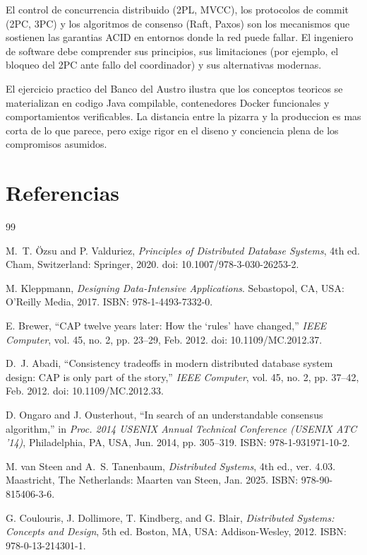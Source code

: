 \documentclass[11pt,a4paper]{article}
\begin{document}
El control de concurrencia distribuido (2PL, MVCC), los protocolos de commit (2PC, 3PC) y los algoritmos de consenso (Raft, Paxos) son los mecanismos que sostienen las garantias ACID en entornos donde la red puede fallar. El ingeniero de software debe comprender sus principios, sus limitaciones (por ejemplo, el bloqueo del 2PC ante fallo del coordinador) y sus alternativas modernas.

El ejercicio practico del Banco del Austro ilustra que los conceptos teoricos se materializan en codigo Java compilable, contenedores Docker funcionales y comportamientos verificables. La distancia entre la pizarra y la produccion es mas corta de lo que parece, pero exige rigor en el diseno y conciencia plena de los compromisos asumidos.

\section*{Referencias}
\begin{thebibliography}{99}

M.~T. \"Ozsu and P. Valduriez,
\textit{Principles of Distributed Database Systems},
4th ed.
Cham, Switzerland: Springer, 2020.
doi: 10.1007/978-3-030-26253-2.

M. Kleppmann,
\textit{Designing Data-Intensive Applications}.
Sebastopol, CA, USA: O'Reilly Media, 2017.
ISBN: 978-1-4493-7332-0.

E. Brewer,
``CAP twelve years later: How the `rules' have changed,''
\textit{IEEE Computer}, vol. 45, no. 2, pp. 23--29, Feb. 2012.
doi: 10.1109/MC.2012.37.

D.~J. Abadi,
``Consistency tradeoffs in modern distributed database system design: CAP is only part of the story,''
\textit{IEEE Computer}, vol. 45, no. 2, pp. 37--42, Feb. 2012.
doi: 10.1109/MC.2012.33.

D. Ongaro and J. Ousterhout,
``In search of an understandable consensus algorithm,''
in \textit{Proc. 2014 USENIX Annual Technical Conference (USENIX ATC '14)},
Philadelphia, PA, USA, Jun. 2014, pp. 305--319.
ISBN: 978-1-931971-10-2.

M. van Steen and A.~S. Tanenbaum,
\textit{Distributed Systems},
4th ed., ver. 4.03.
Maastricht, The Netherlands: Maarten van Steen, Jan. 2025.
ISBN: 978-90-815406-3-6.

G. Coulouris, J. Dollimore, T. Kindberg, and G. Blair,
\textit{Distributed Systems: Concepts and Design},
5th ed.
Boston, MA, USA: Addison-Wesley, 2012.
ISBN: 978-0-13-214301-1.

\end{thebibliography}
\end{document}
